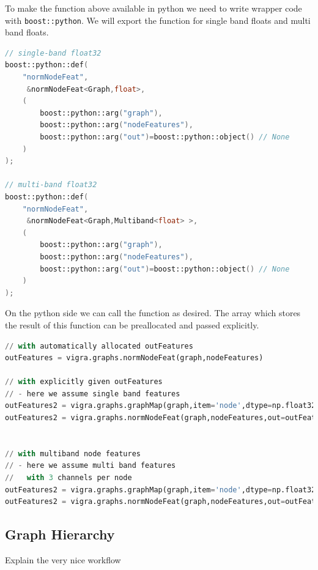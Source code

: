 \begin{minipage}{\textwidth}
To make the function above available in python
we need to write wrapper code with \lstinline{boost::python}.
We will export the function for single band floats and multi band floats.

\begin{minipage}{\textwidth}\vspace{-0.75cm}\begin{lstlisting}[language=c++]
// single-band float32
boost::python::def(
    "normNodeFeat",
     &normNodeFeat<Graph,float>,
    (
        boost::python::arg("graph"),
        boost::python::arg("nodeFeatures"),
        boost::python::arg("out")=boost::python::object() // None
    )
);

// multi-band float32
boost::python::def(
    "normNodeFeat",
     &normNodeFeat<Graph,Multiband<float> >,
    (
        boost::python::arg("graph"),
        boost::python::arg("nodeFeatures"),
        boost::python::arg("out")=boost::python::object() // None
    )
);
\end{lstlisting}\end{minipage}\vspace{0.5cm}

\end{minipage}


On the python side we can call the function as desired.
The array which stores the result of this
function can be preallocated and passed explicitly.

\begin{minipage}{\textwidth}\vspace{-0.75cm}\begin{lstlisting}[language=Python]
// with automatically allocated outFeatures
outFeatures = vigra.graphs.normNodeFeat(graph,nodeFeatures)

// with explicitly given outFeatures
// - here we assume single band features
outFeatures2 = vigra.graphs.graphMap(graph,item='node',dtype=np.float32)
outFeatures2 = vigra.graphs.normNodeFeat(graph,nodeFeatures,out=outFeatures2)


// with multiband node features 
// - here we assume multi band features
//   with 3 channels per node
outFeatures2 = vigra.graphs.graphMap(graph,item='node',dtype=np.float32,channels=3)
outFeatures2 = vigra.graphs.normNodeFeat(graph,nodeFeatures,out=outFeatures2)
\end{lstlisting}\end{minipage}\vspace{0.5cm}




\subsection{Graph Hierarchy}
    
Explain the very nice workflow 
